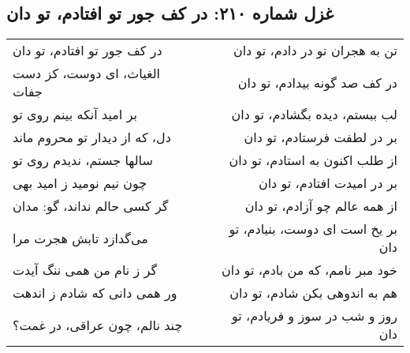 \begin{center}
\section*{غزل شماره ۲۱۰: در کف جور تو افتادم، تو دان}
\label{sec:210}
\begin{longtable}{l p{0.5cm} r}
در کف جور تو افتادم، تو دان
&&
تن به هجران تو در دادم، تو دان
\\
الغیاث، ای دوست، کز دست جفات
&&
در کف صد گونه بیدادم، تو دان
\\
بر امید آنکه بینم روی تو
&&
لب ببستم، دیده بگشادم، تو دان
\\
دل، که از دیدار تو محروم ماند
&&
بر در لطفت فرستادم، تو دان
\\
سالها جستم، ندیدم روی تو
&&
از طلب اکنون به استادم، تو دان
\\
چون نیم نومید ز امید بهی
&&
بر در امیدت افتادم، تو دان
\\
گر کسی حالم نداند، گو: مدان
&&
از همه عالم چو آزادم، تو دان
\\
می‌گدازد تابش هجرت مرا
&&
بر یخ است ای دوست، بنیادم، تو دان
\\
گر ز نام من همی ننگ آیدت
&&
خود مبر نامم، که من بادم، تو دان
\\
ور همی دانی که شادم ز اندهت
&&
هم به اندوهی بکن شادم، تو دان
\\
چند نالم، چون عراقی، در غمت؟
&&
روز و شب در سوز و فریادم، تو دان
\\
\end{longtable}
\end{center}
